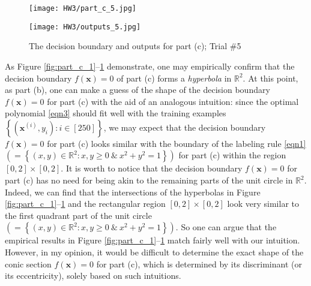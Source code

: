 \documentclass[11pt]{article}
\begin{document}
\begin{figure}
    \begin{minipage}{0.48\textwidth}
        \centering
        \texttt{[image: HW3/part\_c\_5.jpg]}
    \end{minipage}
    \begin{minipage}{0.48\textwidth}
        \centering
        \texttt{[image: HW3/outputs\_5.jpg]}
    \end{minipage}
    \caption{The decision boundary and outputs for part (c); Trial \#5}
    \label{fig:part_c_5}
\end{figure}

\newpage

\indent  As Figure \ref{fig:part_c_1}--\ref{fig:part_c_5} demonstrate, one may empirically confirm that the decision boundary $f(\mathbf{x}) = 0$ of part (c) forms a \emph{hyperbola} in $\mathbb{R}^2$. At this point, as part (b), one can make a guess of the shape of the decision boundary $f(\mathbf{x}) = 0$ for part (c) with the aid of an analogous intuition: since the optimal polynomial \eqref{eqn3} should fit well with the training examples $\left\{ \left( \mathbf{x}^{(i)}, y_i \right) : i \in [250] \right\}$, we may expect that the decision boundary $f(\mathbf{x}) = 0$ for part (c) looks similar with the boundary of the labeling rule \eqref{eqn1} $\left( = \left\{ (x, y) \in \mathbb{R}^2 : x, y \geq 0 \ \& \ x^2 + y^2 = 1 \right\} \right)$ for part (c) within the region $\left[ 0, 2 \right] \times \left[ 0, 2 \right]$. It is worth to notice that the decision boundary $f(\mathbf{x}) = 0$ for part (c) has no need for being akin to the remaining parts of the unit circle in $\mathbb{R}^2$. Indeed, we can find that the intersections of the hyperbolas in Figure \ref{fig:part_c_1}--\ref{fig:part_c_5} and the rectangular region $\left[ 0, 2 \right] \times \left[ 0, 2 \right]$ look very similar to the first quadrant part of the unit circle $\left( = \left\{ (x, y) \in \mathbb{R}^2 : x, y \geq 0 \ \& \ x^2 + y^2 = 1 \right\} \right)$. So one can argue that the empirical results in Figure \ref{fig:part_c_1}--\ref{fig:part_c_5} match fairly well with our intuition. However, in my opinion, it would be difficult to determine the exact shape of the conic section $f(\mathbf{x}) = 0$ for part (c), which is determined by its discriminant (or its eccentricity), solely based on such intuitions.

\newpage

\appendix




\end{document}
